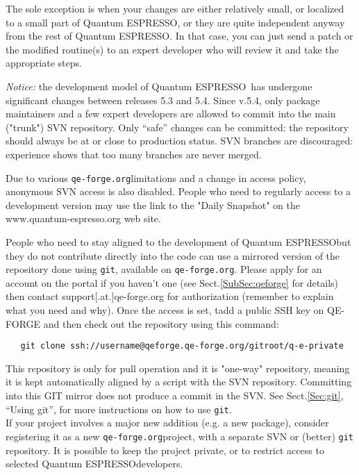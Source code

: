 \documentclass[12pt,a4paper]{article}
\def\qe{{\sc Quantum ESPRESSO}}
\def\qeforge{\texttt{qe-forge.org}}
\begin{document}
The sole exception is when your changes are either relatively small, or
localized to a small part of \qe, or they are quite independent anyway
from the rest of \qe. In that case, you can just send a patch or the
modified routine(s) to an expert developer who will review it and
take the appropriate steps.

{\em Notice:} the development model of \qe\ has undergone
significant changes between releases 5.3 and 5.4. Since v.5.4, only
package maintainers and a few expert developers are allowed to commit
into the main ("trunk") SVN repository. Only ``safe'' changes can be
committed: the repository should always be at or close to production
status. SVN branches are discouraged: experience shows that too many
branches are never merged.

Due to various \qeforge limitations and a change in access policy, 
anonymous SVN access is also disabled. People who need to regularly access 
to a development version may use the link to the "Daily Snapshot" 
on the www.quantum-espresso.org web site.

People who need to stay aligned to the development of \qe but they do not 
contribute directly into the code can use a mirrored version of the repository 
done using \texttt{git}, available on \qeforge. Please apply for an account on 
the portal if you haven't one (see Sect.\ref{SubSec:qeforge} for details) then 
contact support[.at.]qe-forge.org for authorization (remember to explain  what 
you need and why). Once the access is set, tadd a public SSH key on QE-FORGE and 
then check out the repository using this command:
\begin{verbatim}
   git clone ssh://username@qeforge.qe-forge.org/gitroot/q-e-private
\end{verbatim}

This repository is only for pull operation and it is "one-way" repository,
meaning it is kept automatically aligned by a script with the SVN repository.
Committing into this GIT mirror does not produce a commit in the SVN. See 
Sect.\ref{Sec:git}, ``Using git'', for more instructions on how to 
use \texttt{git}.\\

If your project involves a major new addition (e.g. a new package), 
consider registering it as a new \qeforge project, with a separate 
SVN or (better) \texttt{git} repository. It is possible to keep the 
project private, or to restrict access to selected \qe developers.\\
\end{document}
